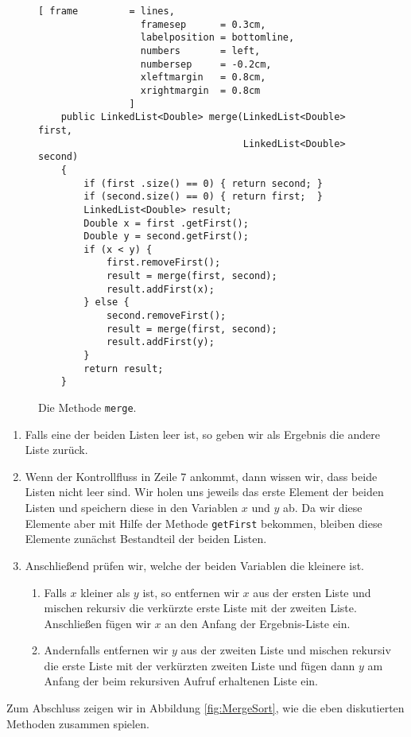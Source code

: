\begin{figure}[!ht]
  \centering
\begin{Verbatim}[ frame         = lines, 
                  framesep      = 0.3cm, 
                  labelposition = bottomline,
                  numbers       = left,
                  numbersep     = -0.2cm,
                  xleftmargin   = 0.8cm,
                  xrightmargin  = 0.8cm
                ]
    public LinkedList<Double> merge(LinkedList<Double> first, 
                                    LinkedList<Double> second) 
    {
        if (first .size() == 0) { return second; }
        if (second.size() == 0) { return first;  }
        LinkedList<Double> result;
        Double x = first .getFirst();
        Double y = second.getFirst();
        if (x < y) {
            first.removeFirst();
            result = merge(first, second);
            result.addFirst(x);
        } else {
            second.removeFirst();
            result = merge(first, second);
            result.addFirst(y);
        }
        return result;
    }
\end{Verbatim}
\vspace*{-0.3cm}
  \caption{Die Methode \texttt{merge}.}
  \label{fig:merge}
\end{figure}

\begin{enumerate}
\item Falls eine der beiden Listen leer ist, so geben wir als Ergebnis die
      andere Liste zur\"uck.
\item Wenn der Kontrollfluss in Zeile 7 ankommt, dann wissen wir, dass beide Listen
      nicht leer sind.  Wir holen uns jeweils das erste Element der beiden Listen
      und speichern diese in den Variablen $x$ und $y$ ab.  Da wir diese Elemente
      aber mit Hilfe der Methode \texttt{getFirst} bekommen, bleiben diese Elemente
      zun\"achst Bestandteil der beiden Listen.
\item Anschlie{\ss}end pr\"ufen wir, welche der beiden Variablen die kleinere ist.
      \begin{enumerate}
      \item Falls $x$ kleiner als $y$ ist, so entfernen wir $x$ aus der ersten Liste
            und mischen rekursiv die verk\"urzte erste Liste mit der zweiten Liste.
            Anschlie{\ss}en f\"ugen wir $x$ an den Anfang der Ergebnis-Liste ein.
      \item Andernfalls entfernen wir $y$ aus der zweiten Liste
            und mischen rekursiv die erste Liste mit der verk\"urzten zweiten Liste und
            f\"ugen dann $y$ am Anfang der beim rekursiven Aufruf erhaltenen Liste ein.
      \end{enumerate}
\end{enumerate}
Zum Abschluss zeigen wir in Abbildung \ref{fig:MergeSort}, wie die eben diskutierten
Methoden zusammen spielen.

